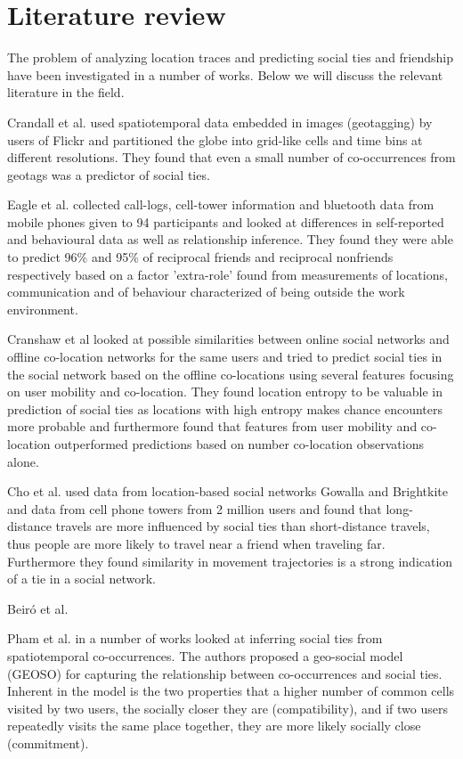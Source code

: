 \chapter{Literature review}
\label{chap:literature_review}
The problem of analyzing location traces and predicting social ties and friendship have been investigated in a number of works.
Below we will discuss the relevant literature in the field.

Crandall et al.\cite{crandall2010inferring} used spatiotemporal data embedded in images (geotagging) by users of Flickr and partitioned the globe into grid-like cells and time bins at different resolutions. They found that even a small number of co-occurrences from geotags was a predictor of social ties.

Eagle et al.\cite{eagle} collected call-logs, cell-tower information and bluetooth data from mobile phones given to 94 participants and looked at differences in self-reported and behavioural data as well as relationship inference. They found they were able to predict 96\% and 95\% of reciprocal friends and reciprocal nonfriends respectively based on a factor 'extra-role' found from measurements of locations, communication and of behaviour characterized of being outside the work environment.

Cranshaw et al\cite{cranshaw2010bridging} looked at possible similarities between online social networks and offline co-location networks for the same users and tried to predict social ties in the social network based on the offline co-locations using several features focusing on user mobility and co-location. They found location entropy to be valuable in prediction of social ties as locations with high entropy makes chance encounters more probable and furthermore found that features from user mobility and co-location outperformed predictions based on number co-location observations alone.

Cho et al.\cite{FaMUMiLBSN} used data from location-based social networks Gowalla and Brightkite and data from cell phone towers from 2 million users and found that long-distance travels are more influenced by social ties than short-distance travels, thus people are more likely to travel near a friend when traveling far. Furthermore they found similarity in movement trajectories is a strong indication of a tie in a social network.

Beiró et al. \cite{human_mob_through_assi}

Pham et al. in a number of works looked at inferring social ties from spatiotemporal co-occurrences\cite{pham2011towards}\cite{iRWRfSD}. The authors proposed a geo-social model (GEOSO) for capturing the relationship between co-occurrences and social ties. Inherent in the model is the two properties that a higher number of common cells visited by two users, the socially closer they are (compatibility), and if two users repeatedly visits the same place together, they are more likely socially close (commitment).

